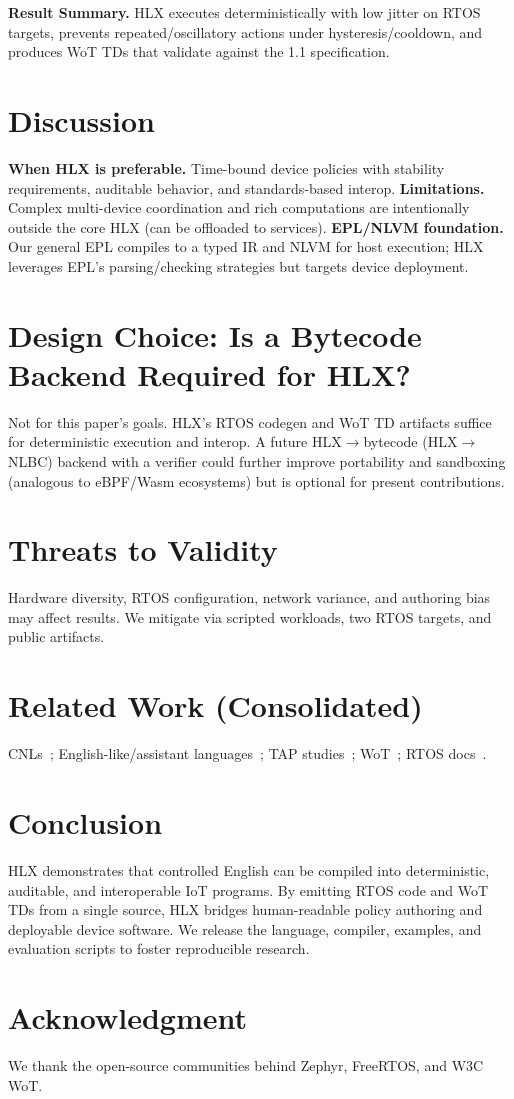 \documentclass[journal]{IEEEtran}
\begin{document}
\noindent\textbf{Result Summary.} HLX executes deterministically with low jitter on RTOS targets, prevents repeated/oscillatory actions under hysteresis/cooldown, and produces WoT TDs that validate against the 1.1 specification.

\section{Discussion}
\textbf{When HLX is preferable.} Time-bound device policies with stability requirements, auditable behavior, and standards-based interop. \textbf{Limitations.} Complex multi-device coordination and rich computations are intentionally outside the core HLX (can be offloaded to services). \textbf{EPL/NLVM foundation.} Our general EPL compiles to a typed IR and NLVM for host execution; HLX leverages EPL’s parsing/checking strategies but targets device deployment.

\section{Design Choice: Is a Bytecode Backend Required for HLX?}
Not for this paper’s goals. HLX’s RTOS codegen and WoT TD artifacts suffice for deterministic execution and interop. A future HLX$\rightarrow$bytecode (HLX$\rightarrow$NLBC) backend with a verifier could further improve portability and sandboxing (analogous to eBPF/Wasm ecosystems) but is optional for present contributions.

\section{Threats to Validity}
Hardware diversity, RTOS configuration, network variance, and authoring bias may affect results. We mitigate via scripted workloads, two RTOS targets, and public artifacts.

\section{Related Work (Consolidated)}
CNLs~\cite{KuhnCNL14,ACEManual}; English-like/assistant languages~\cite{InformSite,AppleScriptGuide,ThingTalk22,GeniePLDI19}; TAP studies~\cite{UrIFTTT16,BrackenburyTAP19}; WoT~\cite{WoT11}; RTOS docs~\cite{ZephyrDocs,FreeRTOSDocs}.

\section{Conclusion}
HLX demonstrates that controlled English can be compiled into deterministic, auditable, and interoperable IoT programs. By emitting RTOS code and WoT TDs from a single source, HLX bridges human-readable policy authoring and deployable device software. We release the language, compiler, examples, and evaluation scripts to foster reproducible research.

\section*{Acknowledgment}
We thank the open-source communities behind Zephyr, FreeRTOS, and W3C WoT.



\end{document}

